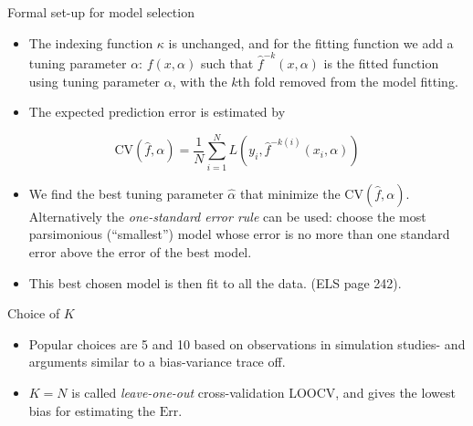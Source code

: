 \documentclass[
  ignorenonframetext,
]{beamer}
\providecommand{\tightlist}{%
  \setlength{\itemsep}{0pt}\setlength{\parskip}{0pt}}
\begin{document}
\begin{frame}

\begin{block}{Formal set-up for model selection}

\begin{itemize}
\item
  The indexing function \(\kappa\) is unchanged, and for the fitting
  function we add a tuning parameter \(\alpha\): \(f(x,\alpha)\) such
  that \(\hat{f}^{-k}(x,\alpha)\) is the fitted function using tuning
  parameter \(\alpha\), with the \(k\)th fold removed from the model
  fitting.
\item
  The expected prediction error is estimated by
\end{itemize}

\[ \text{CV}(\hat{f},\alpha)=\frac{1}{N}\sum_{i=1}^N L(y_i,\hat{f}^{-k(i)}(x_i,\alpha))\]

\begin{itemize}
\item
  We find the best tuning parameter \(\hat{\alpha}\) that minimize the
  \(\text{CV}(\hat{f},\alpha)\). Alternatively the \emph{one-standard
  error rule} can be used: choose the most parsimonious (``smallest'')
  model whose error is no more than one standard error above the error
  of the best model.
\item
  This best chosen model is then fit to all the data. (ELS page 242).
\end{itemize}

\end{block}

\end{frame}

\begin{frame}

\begin{block}{Choice of \(K\)}

\begin{itemize}
\tightlist
\item
  Popular choices are 5 and 10 based on observations in simulation
  studies- and arguments similar to a bias-variance trace off.
\item
  \(K=N\) is called \emph{leave-one-out} cross-validation LOOCV, and
  gives the lowest bias for estimating the \(\text{Err}\).
\end{itemize}

\end{block}

\end{frame}
\end{document}
